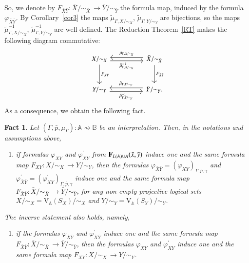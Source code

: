 \documentclass[12pt]{article}
\newtheorem{fact}{Fact}
\theoremstyle{definition}
\def\MA{{\mathbb{A}}}
\def\MB{{\mathbb{B}}}
\def\V{{\mathrm{V}}}
\begin{document}
So, we denote by $F_{\bar X \bar Y}\colon \bar X/{\sim_{\bar X}} \,\to \bar Y/{\sim_{\bar Y}}$ the formula map, induced by the formula $\varphi_{\bar X \bar Y}$. By Corollary~\ref{cor3} the maps $\tilde\mu_{\Gamma,X/{\sim_X}}$, $\tilde\mu_{\Gamma,Y/{\sim_Y}}$ are bijections, so the maps $\tilde\mu^{-1}_{\Gamma,X/{\sim_X}}$, $\tilde\mu^{-1}_{\Gamma,Y/{\sim_Y}}$ are well-defined. The Reduction Theorem~\ref{RT} makes the following diagram commutative:
\begin{equation}\label{eq:F_mu}
 \begin{tikzcd}[column sep=huge, row sep=large]
X/{\sim_X} 
\arrow[r,leftarrow,shift left,"\tilde\mu_{\Gamma,X/{\sim_X}}"]
\arrow[r,rightarrow,shift right,swap,"\tilde\mu_{\Gamma,X/{\sim_X}}^{-1}"] 
\arrow{d}{F_{XY}} 
&\bar X/{\sim_{\bar X}} 
\arrow{d}{F_{\bar X \bar Y}}\\
Y/{\sim_Y} 
\arrow[r,leftarrow,shift left,"\tilde\mu_{\Gamma,Y/{\sim_Y}}"]
\arrow[r,rightarrow,shift right,swap,"\tilde\mu_{\Gamma,Y/{\sim_Y}}^{-1}"]  
&\bar Y/{\sim_{\bar Y}}.
\end{tikzcd}
\end{equation}
As a consequence, we obtain the following fact.

\begin{fact}\label{fact15}
Let $(\Gamma,\bar p,\mu_\Gamma)\colon\MA\rightsquigarrow\MB$ be an interpretation. Then, in the notations and assumptions above, 
\begin{enumerate}[label=(F\arabic*)]\addtocounter{enumi}{5}
    \item\label{F6} if formulas $\varphi_{XY}$ and $\varphi^\prime_{XY}$ from ${\bf F}_{L(\MA)\cup A}(\bar x,\bar y)$ induce one and the same formula map $F_{XY}\colon X/{\sim_X}\, \to Y/{\sim_Y}$, then the formulas $\varphi_{\bar X \bar Y}=(\varphi_{XY})_{\Gamma, \bar p, \gamma}$ and $\varphi^\prime_{\bar X \bar Y}=(\varphi^\prime_{XY})_{\Gamma, \bar p, \gamma}$ induce one and the same formula map $F_{\bar X \bar Y}\colon \bar X/{\sim_{\bar X}} \,\to \bar Y/{\sim_{\bar Y}}$, for any non-empty projective logical sets $X/{\sim_X}=\V_\MA(S_X)/{\sim_X}$ and $Y/{\sim_Y}=\V_\MA(S_Y)/{\sim_Y}$.
\end{enumerate}
The inverse statement also holds, namely, 
\begin{enumerate}[label=(E\arabic*)]\addtocounter{enumi}{2}
    \item\label{E3} if the formulas $\varphi_{\bar X \bar Y}$ and $\varphi^\prime_{\bar X \bar Y}$ induce one and the same formula map $F_{\bar X \bar Y}\colon \bar X/{\sim_{\bar X}} \,\to \bar Y/{\sim_{\bar Y}}$, then the formulas $\varphi_{XY}$ and $\varphi^\prime_{XY}$ induce one and the same formula map $F_{XY}\colon X/{\sim_X}\, \to Y/{\sim_Y}$.
\end{enumerate}
\end{fact}
\end{document}

